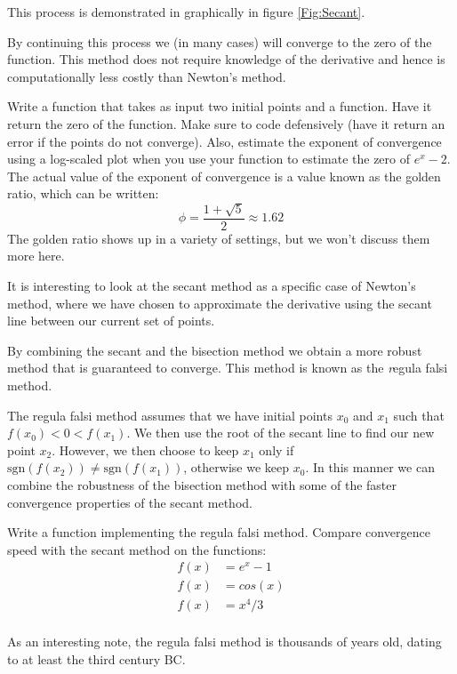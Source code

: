 This process is demonstrated in graphically in figure \ref{Fig:Secant}.

By continuing this process we (in many cases) will converge to the zero of the function. This method does not require knowledge of the derivative and hence is computationally less costly than Newton's method.

\begin{problem}
Write a function that takes as input two initial points and a function. Have it return the zero of the function. Make sure to code defensively (have it return an error if the points do not converge). Also, estimate the exponent of convergence using a log-scaled plot when you use your function to estimate the zero of $e^x-2$. The actual value of the exponent of convergence is a value known as the golden ratio, which can be written:
\[
\phi = \frac{1 + \sqrt{5}}{2} \approx 1.62
\]
The golden ratio shows up in a variety of settings, but we won't discuss them more here.
\end{problem}

It is interesting to look at the secant method as a specific case of Newton's method, where we have chosen to approximate the derivative using the secant line between our current set of points.

By combining the secant and the bisection method we obtain a more robust method that is guaranteed to converge. This method is known as the {\emph regula falsi} method.

The regula falsi method assumes that we have initial points $x_0$ and $x_1$ such that $f(x_0) < 0 < f(x_1)$. We then use the root of the secant line to find our new point $x_2$. However, we then choose to keep $x_1$ only if $\mbox{sgn}(f(x_2)) \neq \mbox{sgn}(f(x_1))$, otherwise we keep $x_0$. In this manner we can combine the robustness of the bisection method with some of the faster convergence properties of the secant method.

\begin{problem}
Write a function implementing the regula falsi method. Compare convergence speed with the secant method on the functions:
\begin{align*}
f(x) &= e^x-1\\
f(x) &= cos(x)\\
f(x) &= x^4/3\\
\end{align*}
\end{problem}

As an interesting note, the regula falsi method is thousands of years old, dating to at least the third century BC.

